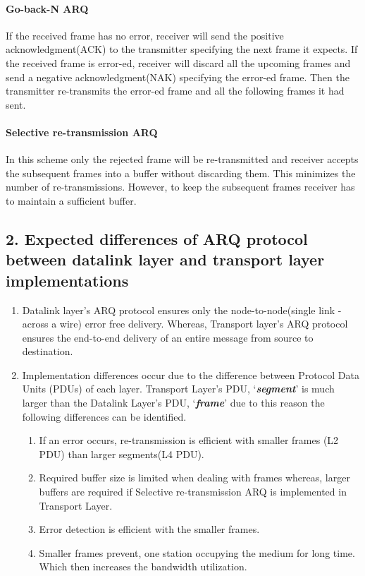 \documentclass[a4paper,11pt]{article}
\begin{document}
\paragraph{Go-back-N ARQ} If the received frame has no error, receiver will send the positive acknowledgment(ACK) to the transmitter specifying the next frame it expects. If the received frame is error-ed, receiver will discard all the upcoming frames and send a negative acknowledgment(NAK) specifying the error-ed frame. Then the transmitter re-transmits the error-ed frame and all the following frames it had sent. 

\paragraph{Selective re-transmission ARQ} In this scheme only the rejected frame will be re-transmitted and receiver accepts the subsequent frames into a buffer without discarding them. This minimizes the number of re-transmissions. However, to keep the subsequent frames receiver has to maintain a sufficient buffer.  

\vfill
\subsection*{2. Expected differences of ARQ protocol between datalink layer and transport layer implementations}

\begin{enumerate}
	
	
	\item Datalink layer's ARQ protocol ensures only the node-to-node(single link - across a wire) error free delivery. Whereas, Transport layer's ARQ protocol ensures the end-to-end delivery of an entire message from source to destination.
	
	\item Implementation differences occur due to the difference between Protocol Data Units (PDUs) of each layer.  Transport Layer's PDU, `\textbf{\textit{segment}}' is much larger than the Datalink Layer's PDU, `\textbf{\textit{frame}}' due to this reason the following differences can be identified.
	
	\begin{enumerate}[~I.]
		\item If an error occurs, re-transmission is efficient with smaller frames (L2 PDU) than larger segments(L4 PDU).
		\item Required buffer size is limited when dealing with frames whereas, larger buffers are required if Selective re-transmission ARQ is implemented in Transport Layer. 
		\item Error detection is efficient with the smaller frames.
		\item Smaller frames prevent, one station occupying the medium for long time. Which then increases the bandwidth utilization.
	\end{enumerate}
	 

	
\end{enumerate}
\end{document}
